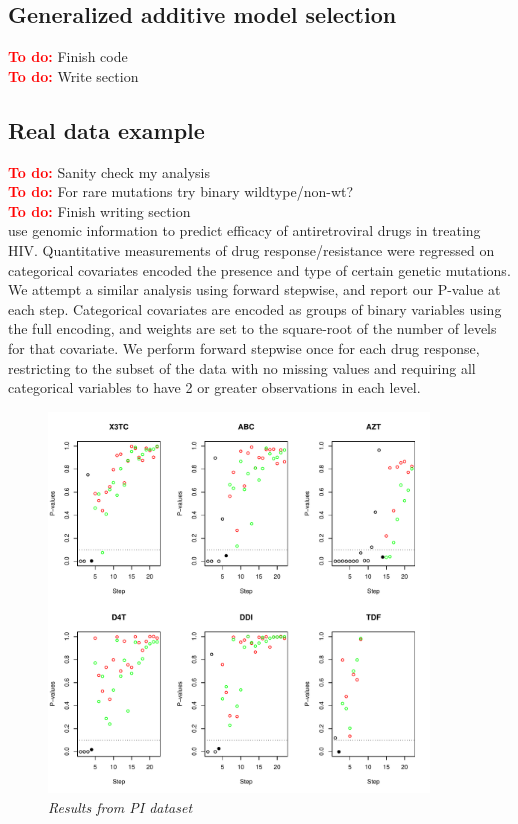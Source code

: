 \documentclass{imsart}
\newcommand{\todo}{\textcolor{red}{\textbf{To do: }}}
\begin{document}
\subsection{Generalized additive model selection}
\todo Finish code \\
\todo Write section \\

\subsection{Real data example}
\label{sec:hiv}
\todo Sanity check my analysis \\
\todo For rare mutations try binary wildtype/non-wt? \\
\todo Finish writing section \\

\cite{HIV} use genomic information to predict efficacy of antiretroviral
drugs in treating HIV. Quantitative measurements of drug
response/resistance were regressed on categorical covariates encoded
the presence and type of certain genetic mutations. We attempt a similar
analysis using forward stepwise, and report our P-value at each step.
Categorical covariates are encoded as groups of binary variables using
the full encoding, and weights are set to the square-root of the
number of levels for that covariate. We perform forward stepwise once
for each drug response, restricting to the subset of the data with
no missing values and requiring all categorical variables to have 2 or
greater observations in each level. 

\begin{figure}
\begin{center}
\includegraphics[width=0.9\textwidth]{../figs/HIV_PI.pdf}
\caption{\small \it Results from PI dataset}
\label{fig:HIVPI}
\end{center}
\end{figure}
\end{document}
